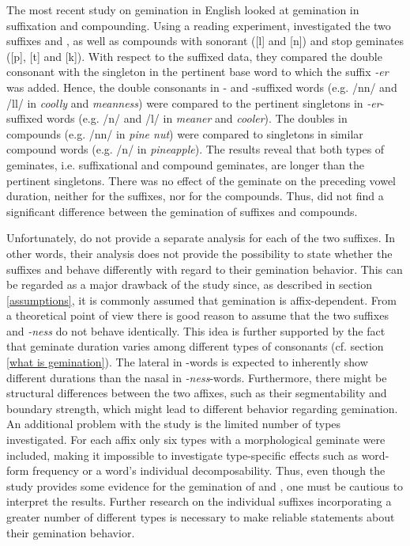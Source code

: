The most recent study on gemination in English looked at gemination in suffixation and compounding. Using a reading experiment, \cite{Kotzor.2016} investigated the two suffixes  and , as well as compounds with sonorant ([l] and [n]) and stop geminates ([p], [t] and [k]). With respect to the suffixed data, they compared the double consonant with the singleton in the pertinent base word to which the suffix \textit{-er} was added. Hence, the double consonants in - and -suffixed words (e.g. /nn/  and /ll/ in \textit{coolly} and \textit{meanness}) were compared to the pertinent singletons in \textit{-er}-suffixed words (e.g. /n/ and /l/ in \textit{meaner} and \textit{cooler}). The doubles in compounds (e.g. /nn/ in \textit{pine nut}) were compared to singletons in similar compound words (e.g. /n/ in \textit{pineapple}). 
The results reveal that both types of geminates, i.e. suffixational and compound geminates, are longer than the pertinent singletons. There was no effect of the geminate on the preceding vowel duration, neither for the suffixes, nor for the compounds. Thus, \cite{Kotzor.2016} did not find a significant difference between the gemination of suffixes and compounds. 

Unfortunately, \cite{Kotzor.2016} do not provide a separate analysis for each of the two suffixes. In other words, their analysis does not provide the possibility to state whether the suffixes  and  behave differently with regard to their gemination behavior. This can be regarded as a major drawback of the study since, as described in section \ref{assumptions}, it is commonly assumed that gemination is affix-dependent. From a theoretical point of view there is good reason to assume that the two suffixes  and \textit{-ness} do not behave identically. 
This idea is further supported by the fact that geminate duration varies among different types of consonants (cf. section \ref{what is gemination}). The lateral in -words is expected to inherently show different durations than the nasal in \textit{-ness}-words. Furthermore, there might be structural differences between the two affixes, such as their segmentability and boundary strength, which might lead to different behavior regarding gemination. 
An additional problem with the study is the limited number of types investigated. For each affix only six types with a morphological geminate were included, making it impossible to investigate type-specific effects such as word-form frequency or a word's individual decomposability. Thus, even though the study provides some evidence for the gemination of  and , one must be cautious to interpret the results. Further research on the individual suffixes incorporating a greater number of different types is necessary to make reliable statements about their gemination behavior.


